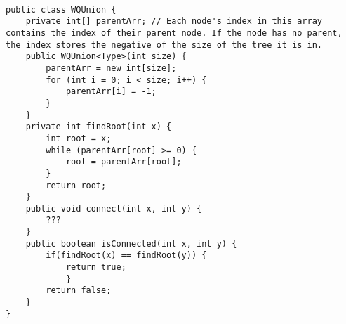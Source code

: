 \begin{blocksection}
\begin{lstlisting}

public class WQUnion {
    private int[] parentArr; // Each node's index in this array contains the index of their parent node. If the node has no parent, the index stores the negative of the size of the tree it is in. 
    public WQUnion<Type>(int size) {
        parentArr = new int[size];
        for (int i = 0; i < size; i++) {
            parentArr[i] = -1;
        }
    }
    private int findRoot(int x) {
        int root = x;
        while (parentArr[root] >= 0) {
            root = parentArr[root];
        }
        return root;
    }
    public void connect(int x, int y) {
        ???
    }
    public boolean isConnected(int x, int y) {
        if(findRoot(x) == findRoot(y)) {
            return true;
            }
        return false;
    }
}
\end{lstlisting}
\end{blocksection}
\clearpage